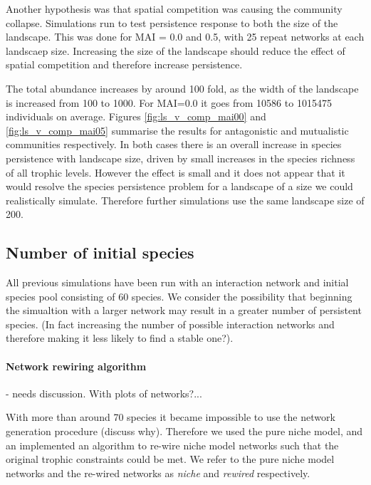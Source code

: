 Another hypothesis was that spatial competition was causing the community collapse. Simulations run to test persistence response to both the size of the landscape. This was done for MAI = 0.0 and 0.5, with 25 repeat networks at each landscaep size. Increasing the size of the landscape should reduce the effect of spatial competition and therefore increase persistence.  

The total abundance increases by around 100 fold, as the width of the landscape is increased from 100 to 1000. For MAI=0.0 it goes from 10586 to 1015475 individuals on average. Figures \ref{fig:ls_v_comp_mai00} and \ref{fig:ls_v_comp_mai05} summarise the results for antagonistic and mutualistic communities respectively. In both cases there is an overall increase in species persistence with landscape size, driven by small increases in the species richness of all trophic levels. However the effect is small and it does not appear that it would resolve the species persistence problem for a landscape of a size we could realistically simulate. Therefore further simulations use the same landscape size of 200.

\newpage
\subsection{Number of initial species}
\label{sec:numsp_vp}

All previous simulations have been run with an interaction network and initial species pool consisting of 60 species. We consider the possibility that beginning the simualtion with a larger network may result in a greater number of persistent species. (In fact increasing the number of possible interaction networks and therefore making it less likely to find a stable one?).

\paragraph*{Network rewiring algorithm} - needs discussion. With plots of networks?...

With more than around 70 species it became impossible to use the network generation procedure (discuss why). Therefore we used the pure niche model, and an implemented an algorithm to re-wire niche model networks such that the original trophic constraints could be met. We refer to the pure niche model networks and the re-wired networks as \emph{niche} and \emph{rewired} respectively. 


